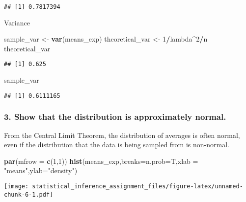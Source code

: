 \documentclass[]{article}
\newenvironment{Shaded}{\begin{snugshade}}{\end{snugshade}}
\newcommand{\KeywordTok}[1]{\textcolor[rgb]{0.13,0.29,0.53}{\textbf{#1}}}
\newcommand{\DataTypeTok}[1]{\textcolor[rgb]{0.13,0.29,0.53}{#1}}
\newcommand{\DecValTok}[1]{\textcolor[rgb]{0.00,0.00,0.81}{#1}}
\newcommand{\StringTok}[1]{\textcolor[rgb]{0.31,0.60,0.02}{#1}}
\newcommand{\OperatorTok}[1]{\textcolor[rgb]{0.81,0.36,0.00}{\textbf{#1}}}
\newcommand{\NormalTok}[1]{#1}
\begin{document}
\begin{verbatim}
## [1] 0.7817394
\end{verbatim}

Variance

\begin{Shaded}
\begin{Highlighting}[]
\NormalTok{sample_var <-}\StringTok{ }\KeywordTok{var}\NormalTok{(means_exp)}
\NormalTok{theoretical_var <-}\StringTok{ }\DecValTok{1}\OperatorTok{/}\NormalTok{lambda}\OperatorTok{^}\DecValTok{2}\OperatorTok{/}\NormalTok{n}
\NormalTok{theoretical_var }
\end{Highlighting}
\end{Shaded}

\begin{verbatim}
## [1] 0.625
\end{verbatim}

\begin{Shaded}
\begin{Highlighting}[]
\NormalTok{sample_var}
\end{Highlighting}
\end{Shaded}

\begin{verbatim}
## [1] 0.6111165
\end{verbatim}

\subsubsection{3. Show that the distribution is approximately
normal.}\label{show-that-the-distribution-is-approximately-normal.}

From the Central Limit Theorem, the distribution of averages is often
normal, even if the distribution that the data is being sampled from is
non-normal.

\begin{Shaded}
\begin{Highlighting}[]
\KeywordTok{par}\NormalTok{(}\DataTypeTok{mfrow =} \KeywordTok{c}\NormalTok{(}\DecValTok{1}\NormalTok{,}\DecValTok{1}\NormalTok{))}
\KeywordTok{hist}\NormalTok{(means_exp,}\DataTypeTok{breaks=}\NormalTok{n,}\DataTypeTok{prob=}\NormalTok{T,}\DataTypeTok{xlab =} \StringTok{"means"}\NormalTok{,}\DataTypeTok{ylab=}\StringTok{"density"}\NormalTok{)}
\end{Highlighting}
\end{Shaded}

\texttt{[image: statistical\_inference\_assignment\_files/figure-latex/unnamed-chunk-6-1.pdf]}
\end{document}
